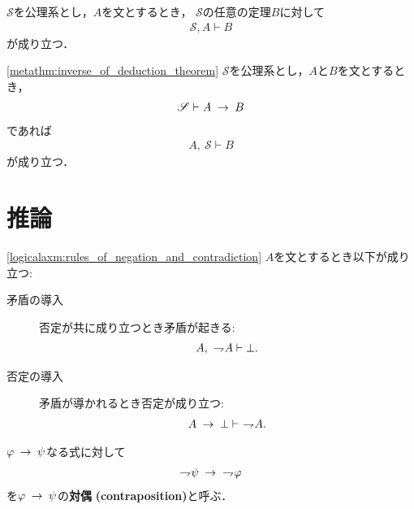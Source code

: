 	\begin{screen}
		\begin{metathm}[公理が増えても証明可能]
			$\mathscr{S}$を公理系とし，$A$を文とするとき，
			$\mathscr{S}$の任意の定理$B$に対して
			\begin{align}
				\mathscr{S}, A \vdash B
			\end{align}
			が成り立つ．
		\end{metathm}
	\end{screen}
	
	\begin{screen}
		\begin{metathm}[演繹法則の逆]
		\ref{metathm:inverse_of_deduction_theorem}
			$\mathscr{S}$を公理系とし，$A$と$B$を文とするとき，
			\begin{align}
				\mathscr{S} \vdash A \hspace{0.25em}\rightarrow\hspace{0.25em} B
			\end{align}
			であれば
			\begin{align}
				A,\ \mathscr{S} \vdash B
			\end{align}
			が成り立つ．
		\end{metathm}
	\end{screen}
	
\section{推論}
	\begin{screen}
		\begin{logicalaxm}[否定と矛盾に関する規則]
		\ref{logicalaxm:rules_of_negation_and_contradiction}
			$A$を文とするとき以下が成り立つ:
			\begin{description}
				\item[矛盾の導入] 否定が共に成り立つとき矛盾が起きる:
					\begin{align}
						A,\ \rightharpoondown\hspace{-0.25em} A \vdash \bot.
					\end{align}
				\item[否定の導入] 矛盾が導かれるとき否定が成り立つ:
					\begin{align}
						A \hspace{0.25em}\rightarrow\hspace{0.25em} \bot \vdash\ \rightharpoondown\hspace{-0.25em} A.
					\end{align}
			\end{description}
		\end{logicalaxm}
	\end{screen}
	
	\begin{screen}
		\begin{dfn}[対偶]
			$\varphi \hspace{0.25em}\rightarrow\hspace{0.25em} \psi$なる式に対して
			\begin{align}
				\rightharpoondown\hspace{-0.25em} \psi \hspace{0.25em}\rightarrow\hspace{0.25em}\ \rightharpoondown\hspace{-0.25em} \varphi
			\end{align}
			を$\varphi \hspace{0.25em}\rightarrow\hspace{0.25em} \psi$の{\bf 対偶}\index{たいぐう@対偶}
			{\bf (contraposition)}と呼ぶ．
		\end{dfn}
	\end{screen}
	
